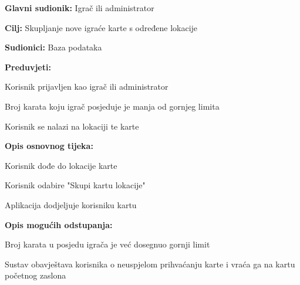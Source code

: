 \noindent {}
\begin{packed_item}
	\item \textbf{Glavni sudionik: } Igrač ili administrator
	\item  \textbf{Cilj:} Skupljanje nove igraće karte s određene lokacije
	\item  \textbf{Sudionici:} Baza podataka
    \item \textbf{Preduvjeti:}
	\item[]  \begin{packed_enum}
	    \item Korisnik prijavljen kao igrač ili administrator
        \item Broj karata koju igrač posjeduje je manja od gornjeg limita
        \item Korisnik se nalazi na lokaciji te karte
	\end{packed_enum}
	\item  \textbf{Opis osnovnog tijeka:}
	\item[] \begin{packed_enum}
        \item Korisnik dođe do lokacije karte
        \item Korisnik odabire "Skupi kartu lokacije"
		\item Aplikacija dodjeljuje korisniku kartu
	\end{packed_enum}
	\item  \textbf{Opis mogućih odstupanja:}
	\item[] \begin{packed_enum}
	    \item Broj karata u posjedu igrača je već dosegnuo gornji limit
        \item[] \begin{packed_enum}
        	\item Sustav obavještava korisnika o neuspjelom prihvaćanju karte i vraća ga na kartu početnog zaslona
        \end{packed_enum}
	\end{packed_enum}
\end{packed_item}

